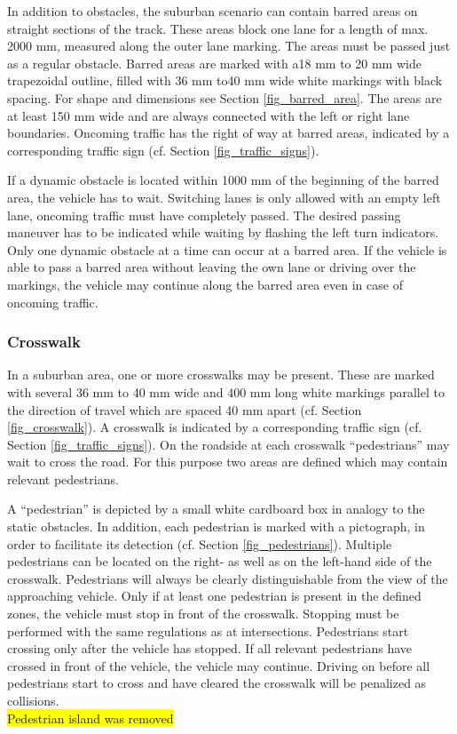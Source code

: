 \documentclass[a4paper]{report}
\begin{document}
{In addition to obstacles, the suburban scenario can contain barred areas on straight sections of the track. These areas block one lane for a length of max. 2000 mm, measured along the outer lane marking. The areas must be passed just as a regular obstacle. Barred areas are marked with a18 mm to 20 mm wide trapezoidal outline, filled with 36 mm to40 mm wide white markings with black spacing. For shape and dimensions see Section \ref{fig_barred_area}. The areas are at least 150 mm wide and are always connected with the left or right lane boundaries. Oncoming traffic has the right of way at barred areas, indicated by a corresponding traffic sign (cf. Section \ref{fig_traffic_signs}). 

If a dynamic obstacle is located within 1000 mm of the beginning of the barred area, the vehicle has to wait. Switching lanes is only allowed with an empty left lane, oncoming traffic must have completely passed. The desired passing maneuver has to be indicated while waiting by flashing the left turn indicators. Only one dynamic obstacle at a time can occur at a barred area. If the vehicle is able to pass a barred area without leaving the own lane or driving over the markings, the vehicle may continue along the barred area even in case of oncoming traffic. 

\subsubsection{Crosswalk}

In a suburban area, one or more crosswalks may be present. These are marked with several 36 mm to 40 mm wide and 400 mm long white markings parallel to the direction of travel which are spaced 40 mm apart (cf. Section \ref{fig_crosswalk}). A crosswalk is indicated by a corresponding traffic sign (cf. Section \ref{fig_traffic_signs}). On the roadside at each crosswalk “pedestrians” may wait to cross the road. For this purpose two areas are defined which may contain relevant pedestrians. 

A “pedestrian” is depicted by a small white cardboard box in analogy to the static obstacles. In addition, each pedestrian is marked with a pictograph, in order to facilitate its detection (cf. Section \ref{fig_pedestrians}). Multiple pedestrians can be located on the right- as well as on the left-hand side of the crosswalk. Pedestrians will always be clearly distinguishable from the view of the approaching vehicle. Only if at least one pedestrian is present in the defined zones, the vehicle must stop in front of the crosswalk. Stopping must be performed with the same regulations as at intersections. Pedestrians start crossing only after the vehicle has stopped. If all relevant pedestrians have crossed in front of the vehicle, the vehicle may continue. Driving on before all pedestrians start to cross and have cleared the crosswalk will be penalized as collisions. 
\bigskip\\
\colorbox{yellow}{Pedestrian island was removed} 

}
\end{document}
